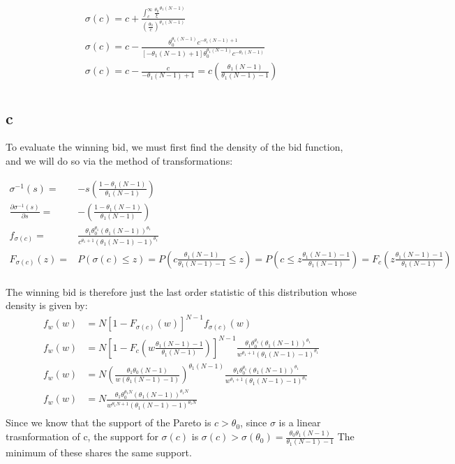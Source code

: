 \documentclass[10pt]{paper}
\begin{document}
\begin{eqnarray*}
  \sigma(c) = c + \frac{\int_c^\infty \frac{\theta_0}{\xi}^{\theta_1(N-1)}}{\left ( \frac{\theta_0}{c} \right )^{\theta_1(N-1)}}\\
  \sigma(c) = c - \frac{\theta_0^{\theta_1(N-1)} c^{-\theta_1(N-1)+1}}{[-\theta_1(N-1) + 1] \theta_0^{\theta_1(N-1)}c^{-\theta_1(N-1)}}\\
  \sigma(c) = c - \frac{c}{-\theta_1(N-1)+1} = c \left ( \frac{\theta_1(N-1)}{\theta_1(N-1)-1} \right )\\
\end{eqnarray*}

\subsection*{c}
To evaluate the winning bid, we must first find the density of the bid
function, and we will do so via the method of transformations:

\begin{eqnarray*}
  \sigma^{-1}(s) = &-s \left ( \frac{1 - \theta_1(N-1)}{\theta_1(N-1)} \right )\\
  \frac{\partial \sigma^{-1}(s)}{\partial s} = &- \left ( \frac{1 - \theta_1(N-1)}{\theta_1(N-1)} \right )\\
  f_{\sigma(c)} = &\frac{\theta_1 \theta_0^{\theta_1} ( \theta_1 (N-1) )^{\theta_1}}{c^{\theta_1+1}( \theta_1(N-1) - 1)^{\theta_1}}\\
  F_{\sigma(c)}(z) = &P( \sigma(c) \leq z ) = P( c \frac{\theta_1(N-1)}{\theta_1(N-1) - 1} \leq z ) = 
  P( c \leq z \frac{\theta_1(N-1)-1}{\theta_1(N-1)} ) = F_c( z \frac{\theta_1(N-1)-1}{\theta_1(N-1)} )\\
\end{eqnarray*}

The winning bid is therefore just the last order statistic of this
distribution whose density is given by:
\begin{eqnarray*}
  f_w(w) &= N [ 1 - F_{\sigma(c)}(w)]^{N-1}f_{\sigma(c)}(w)\\
  f_w(w) &= N [ 1 - F_c( w \frac{\theta_1(N-1)-1}{\theta_1(N-1)} ) ]^{N-1} \frac{\theta_1 \theta_0^{\theta_1} ( \theta_1 (N-1) )^{\theta_1}}{w^{\theta_1+1}( \theta_1(N-1) - 1)^{\theta_1}}\\
  f_w(w) &= N \left ( \frac{\theta_1 \theta_0 (N-1)}{w ( \theta_1(N-1) - 1)} \right )^{\theta_1(N-1)} \frac{\theta_1 \theta_0^{\theta_1} ( \theta_1 (N-1) )^{\theta_1}}{w^{\theta_1+1}( \theta_1(N-1) - 1)^{\theta_1}}\\
  f_w(w) &= N \frac{\theta_1 \theta_0^{\theta_1 N} ( \theta_1 (N-1))^{\theta_1 N}}{w^{\theta_1 N + 1 }( \theta_1(N-1) -1 )^{\theta_1 N}}\\
\end{eqnarray*}
Since we know that the support of the Pareto is $c > \theta_0$, since $\sigma$
is a linear trasnformation of c, the support
for $\sigma(c)$ is $\sigma(c) > \sigma(\theta_0) = \frac{\theta_0 \theta_1 (N-1)}{\theta_1 (N-1) - 1}$
The minimum of these shares the same support.
\end{document}
